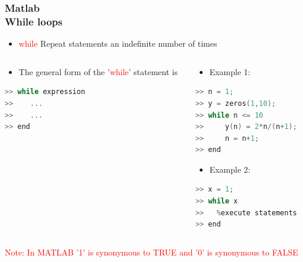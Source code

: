 \documentclass[hyperref={pdfpagelabels=true}]{beamer}
\begin{document}
\begin{frame}[fragile]
\frametitle{Matlab \\ {\small While loops}}
 \begin{itemize}
         \item[\ding{61}] \textcolor{red}{while} Repeat statements an indefinite number of times
         \end{itemize}
\begin{columns}
    \begin{column}{0.58\textwidth}
        \begin{itemize}
         \item[\ding{61}] The general form of the '\textcolor{red}{while}' statement is 
         \end{itemize}
\begin{tcolorbox}
\scriptsize{
\begin{lstlisting}[language=C++,basicstyle=\ttfamily,keywordstyle=\color{red}]
>> while expression
>>    ...
>>    ...
>> end
\end{lstlisting} }
\end{tcolorbox}
      \end{column}
    \begin{column}{0.38\textwidth}
        \begin{itemize}
         \item[\ding{61}] Example 1:
         \end{itemize}
\tiny{
\begin{lstlisting}[language=C++,basicstyle=\ttfamily,keywordstyle=\color{red}]
>> n = 1;
>> y = zeros(1,10);
>> while n <= 10
>>     y(n) = 2*n/(n+1);
>>     n = n+1;
>> end
\end{lstlisting}}
\large{
 \begin{itemize}
         \item[\ding{61}] Example 2:
         \end{itemize}}
\tiny{
\begin{lstlisting}[language=C++,basicstyle=\ttfamily,keywordstyle=\color{red}]
>> x = 1;
>> while x
>>   %execute statements
>> end
\end{lstlisting}}
    \end{column}
\end{columns}
\textcolor{red}{Note: In MATLAB '1' is
synonymous to TRUE and '0' is
synonymous to FALSE}
\end{frame}
\end{document}
